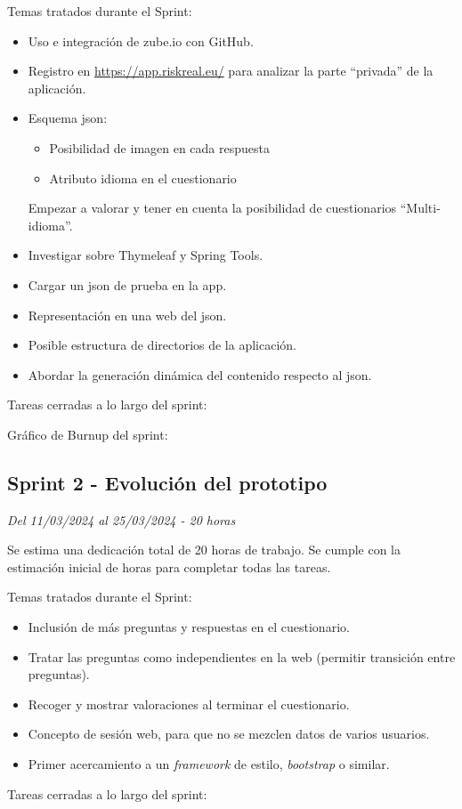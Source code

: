 Temas tratados durante el Sprint:

\begin{itemize}
	\item
	Uso e integración de zube.io con GitHub.
	\item
	Registro en \url{https://app.riskreal.eu/} para analizar la parte ``privada'' de la aplicación.
	\item
	Esquema json:
	\begin{itemize}
		\item
		Posibilidad de imagen en cada respuesta
		\item
		Atributo idioma en el cuestionario
	\end{itemize}
	Empezar a valorar y tener en cuenta la posibilidad de cuestionarios ``Multi-idioma''.
	\item
	Investigar sobre Thymeleaf y Spring Tools.
	\item
	Cargar un json de prueba en la app.
	\item
	Representación en una web del json.
	\item
	Posible estructura de directorios de la aplicación.
	\item
	Abordar la generación dinámica del contenido respecto al json.
\end{itemize}
\clearpage
Tareas  cerradas a lo largo del sprint:

Gráfico de Burnup del sprint:

\clearpage
\subsection{Sprint 2 - Evolución del prototipo}
\textit{Del 11/03/2024 al 25/03/2024 - 20 horas}

Se estima una dedicación total de 20 horas de trabajo.
Se cumple con la estimación inicial de horas para completar todas las tareas.

Temas tratados durante el Sprint:

\begin{itemize}
	\item
	Inclusión de más preguntas y respuestas en el cuestionario.
	\item
	Tratar las preguntas como independientes en la web (permitir transición entre preguntas).
	\item
	Recoger y mostrar valoraciones al terminar el cuestionario.
	\item
	Concepto de sesión web, para que no se mezclen datos de varios usuarios.
	\item
	Primer acercamiento a un \textit{framework} de estilo, \textit{bootstrap} o similar.
\end{itemize}
\clearpage
Tareas cerradas a lo largo del sprint:

